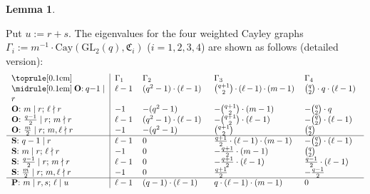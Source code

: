 \documentclass[12pt, reqno]{amsart}
\theoremstyle{definition}
\newtheorem{lemma}[theorem]{Lemma}
\theoremstyle{remark}
\numberwithin{equation}{section}
\newcommand{\fC}{\mathfrak{C}}
\newcommand{\GL}{\mathrm{GL}}
\newcommand{\Cay}{\mathrm{Cay}}
\begin{document}
\begin{lemma}\label{eigenvalue}
	
	Put $u := r + s$. The eigenvalues for the four weighted Cayley graphs $\Gamma_i := m^{-1}\cdot\Cay(\GL_2(q), \fC_i)$ ($i = 1, 2, 3, 4$) are shown as follows (detailed version):
	\[\begin{tabular}{p{3.95cm}|p{0.75cm}p{2.6cm}p{3.4cm}p{2.3cm}}
		\toprule[0.1em]
		
		&$\Gamma_1$ &$\Gamma_2$ &$\Gamma_3$ &$\Gamma_4$	\\
		
		\midrule[0.1em]
		
		\textbf{O}: $q - 1 \mid r$	&$\ell - 1$	&$(q^2 - 1)\cdot(\ell - 1)$	&$\binom{q + 1}{2}\cdot(\ell - 1)\cdot(m - 1)$	&$\binom{q}{2}\cdot q\cdot(\ell - 1)$\\
		
		\textbf{O}: $m \mid r$; $\ell \nmid r$	&$-1$	&$-(q^2 - 1)$	&$-\binom{q + 1}{2}\cdot(m - 1)$	&$-\binom{q}{2}\cdot q$\\
		
		\textbf{O}: $\frac{q - 1}{2} \mid r$; $m \nmid r$	&$\ell - 1$	&$(q^2 - 1)\cdot(\ell - 1)$	&$-\binom{q + 1}{2}\cdot(\ell - 1)$	&$-\binom{q}{2}\cdot(\ell - 1)$\\
		
		\textbf{O}: $\frac{m}{2} \mid r$; $m, \ell \nmid r$	&$-1$	&$-(q^2 - 1)$	&$\binom{q + 1}{2}$	&$\binom{q}{2}$\\
		
		\hline
		
		\textbf{S}: $q - 1 \mid r$	&$\ell - 1$	&$0$	&$\frac{q + 1}{2}\cdot(\ell - 1)\cdot(m - 1)$	&$-\binom{q}{2}\cdot(\ell - 1)$\\
		
		\textbf{S}: $m \mid r$; $\ell \nmid r$	&$-1$	&$0$	&$-\frac{q + 1}{2}\cdot(m - 1)$	&$\binom{q}{2}$\\
		
		\textbf{S}: $\frac{q - 1}{2} \mid r$; $m \nmid r$	&$\ell - 1$	&$0$	&$-\frac{q + 1}{2}\cdot(\ell - 1)$	&$\frac{q - 1}{2}\cdot(\ell - 1)$\\
		
		\textbf{S}: $\frac{m}{2} \mid r$; $m, \ell \nmid r$	&$-1$	&$0$	&$\frac{q + 1}{2}$	&$-\frac{q - 1}{2}$\\
		
		\hline
		
		\textbf{P}: $m \mid r, s$; $\ell \mid u$	&$\ell - 1$	&$(q - 1)\cdot(\ell - 1)$	&$q\cdot(\ell - 1)\cdot(m - 1)$	&$0$\\
		

\end{tabular}\]
\end{lemma}
\end{document}
